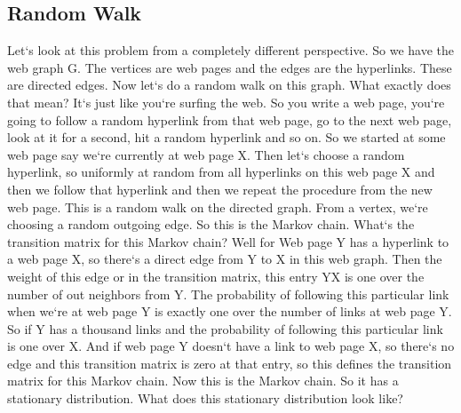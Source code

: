 \subsection{Random Walk}
Let`s look at this problem from a completely different perspective.
So we have the web graph G\@.
The vertices are web pages and the edges are the hyperlinks.
These are directed edges.
Now let`s do a random walk on this graph.
What exactly does that mean? It`s just like you`re surfing the web.
So you write a web page, you`re going to follow a random hyperlink from that web page, go to the next web page, look at it for a second, hit a random hyperlink and so on.
So we started at some web page say we`re currently at web page X\@.
Then let`s choose a random hyperlink, so uniformly at random from all hyperlinks on this web page X and then we follow that hyperlink and then we repeat the procedure from the new web page.
This is a random walk on the directed graph.
From a vertex, we`re choosing a random outgoing edge.
So this is the Markov chain.
What`s the transition matrix for this Markov chain? Well for Web page Y has a hyperlink to a web page X, so there`s a direct edge from Y to X in this web graph.
Then the weight of this edge or in the transition matrix, this entry YX is one over the number of out neighbors from Y\@.
The probability of following this particular link when we`re at web page Y is exactly one over the number of links at web page Y\@.
So if Y has a thousand links and the probability of following this particular link is one over X\@.
And if web page Y doesn`t have a link to web page X, so there`s no edge and this transition matrix is zero at that entry, so this defines the transition matrix for this Markov chain.
Now this is the Markov chain.
So it has a stationary distribution.
What does this stationary distribution look like?

